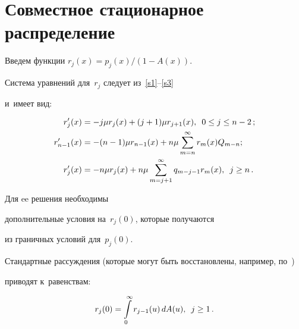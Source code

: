 \pagebreak







\section{Совместное стационарное распределение}



Введем функции ${r_j(x)=p_j(x)/(1-A(x))}$.

Система уравнений для~$r_j$ следует из~\eqref{s1}--\eqref{s3}

и~имеет вид:

\begin{align}

\label{n2}

r'_j(x)&=-j \mu r_j(x)

+(j+1) \mu r_{j+1}(x), \enskip 0\le j \le n-2\,;

\\

\label{n3}

r'_{n-1}(x) &=

- (n-1) \mu r_{n-1}(x)  +   n \mu \sum\limits_{m=n}^\infty r_{m}(x) Q_{m-n};

\\

\label{n4}

r'_j(x) &=

-n \mu r_j(x) + n \mu \sum\limits_{m=j+1}^\infty q_{m-j-1} r_{m}(x), \enskip j\ge n\,.

\end{align}

Для ee решения необходимы

дополнительные условия на~$r_j(0)$, которые получаются

из граничных условий для~$p_j(0)$.

Стандартные рассуждения (которые могут быть восстановлены, например, по~\cite[с.~291]{bo1})

приводят к~равенствам: 

\begin{equation}

\label{init1}

r_j(0) = \int\limits_0^\infty r_{j-1}(u)\, d A(u), \enskip j \ge 1\,.

\end{equation}





